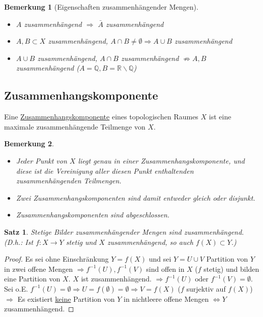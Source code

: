 \documentclass[a4paper,11pt,notitlepage]{report}
\newtheorem{theorem}{Satz}[chapter]
\newtheorem{remark}{Bemerkung}[chapter]
\newcommand{\R}{{\ensuremath{\mathbb{R}}}}
\newcommand{\Q}{{\ensuremath{\mathbb{Q}}}}
\newenvironment{Kasten}[1]
{
\hspace{0.05\linewidth}
\begin{center}
\begin{minipage}{0.9\linewidth}
\setlength{\fboxsep}{10pt}
\definecolor{shadecolor}{gray}{1}
\definecolor{framecolor}{gray}{0}
\def\FrameCommand{\fcolorbox{framecolor}{shadecolor}}
\MakeFramed {\FrameRestore}
\subsection{#1}
\begin{itshape}
}
{
\end{itshape}
\endMakeFramed
\end{minipage}
\end{center}
}
\begin{document}
\begin{remark}[Eigenschaften zusammenhängender Mengen]
	\begin{itemize}
		\item $A$ zusammenhängend $\Rightarrow$ $\bar{A}$ zusammenhängend
		\item $A,B \subset X$ zusammenhängend, $A \cap B \neq \emptyset \Rightarrow A \cup B$ zusammenhängend
		\item $A \cup B$ zusammenhängend, $A \cap B$ zusammenhängend $\not\Rightarrow A,B$ zusammenhängend ($A = \Q, B = \R \backslash \Q$)
	\end{itemize}
\end{remark}

\begin{Kasten}{Zusammenhangskomponente}
	Eine \underline{Zusammenhangskomponente} eines topologischen Raumes $X$ ist eine maximale zusammenhängende Teilmenge von $X$.
\end{Kasten}

\begin{remark}
	\begin{itemize}
		\item Jeder Punkt von $X$ liegt genau in einer Zusammenhangskomponente, und diese ist die Vereinigung aller diesen Punkt enthaltenden zusammenhängenden Teilmengen.
		\item Zwei Zusammenhangskomponenten sind damit entweder gleich oder disjunkt.
		\item Zusammenhangskomponenten sind abgeschlossen.
	\end{itemize}
\end{remark}

\begin{theorem}
	Stetige Bilder zusammenhängender Mengen sind zusammenhängend.
	\newline
	(D.h.: Ist $f \colon X \rightarrow Y$ stetig und $X$ zusammenhängend, so auch $f(X)\subset Y$.)
\end{theorem}

\begin{proof}
	Es sei ohne Einschränkung $Y=f(X)$ und sei $Y=U \cup V$ Partition von $Y$ in zwei offene Mengen $\Rightarrow f^{-1}(U), f^{-1}(V)$ sind offen in $X$ ($f$ stetig) und bilden eine Partition von $X$. $X$ ist zusammenhängend.
	$\Rightarrow f^{-1}(U) \text{ oder } f^{-1}(V) = \emptyset$.
	\newline
	Sei o.E. $f^{-1}(U) = \emptyset \Rightarrow U = f(\emptyset) = \emptyset \Rightarrow V = f(X)$ ($f$ surjektiv auf $f(X)$)
	\newline
	$\Rightarrow$ Es existiert \underline{keine} Partition von $Y$ in nichtleere offene Mengen $\Leftrightarrow Y$ zusammenhängend.
\end{proof}
\end{document}

